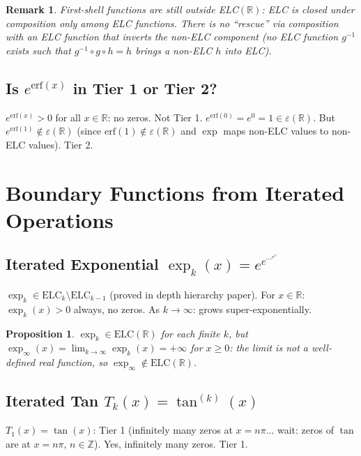 \documentclass[11pt]{article}
\newtheorem{proposition}[theorem]{Proposition}
\newtheorem{remark}[theorem]{Remark}
\begin{document}
\begin{remark}
First-shell functions are still outside ELC$(\mathbb{R})$: ELC is closed under composition
\emph{only among ELC functions}. There is no ``rescue'' via composition with an ELC function
that inverts the non-ELC component (no ELC function $g^{-1}$ exists such that $g^{-1}\circ g\circ h=h$
brings a non-ELC $h$ into ELC).
\end{remark}

\subsection{Is $e^{\mathrm{erf}(x)}$ in Tier 1 or Tier 2?}

$e^{\mathrm{erf}(x)}>0$ for all $x\in\mathbb{R}$: no zeros. Not Tier 1.
$e^{\mathrm{erf}(0)}=e^0=1\in\varepsilon(\mathbb{R})$. But $e^{\mathrm{erf}(1)}\notin\varepsilon(\mathbb{R})$
(since $\mathrm{erf}(1)\notin\varepsilon(\mathbb{R})$ and $\exp$ maps non-ELC values to non-ELC values).
Tier 2.

\section{Boundary Functions from Iterated Operations}

\subsection{Iterated Exponential $\exp_k(x)=e^{e^{\cdots^{e^x}}}$}

$\exp_k\in\mathrm{ELC}_k\setminus\mathrm{ELC}_{k-1}$ (proved in depth hierarchy paper).
For $x\in\mathbb{R}$: $\exp_k(x)>0$ always, no zeros. As $k\to\infty$: grows super-exponentially.

\begin{proposition}
$\exp_k\in\mathrm{ELC}(\mathbb{R})$ for each finite $k$, but
$\exp_\infty(x)=\lim_{k\to\infty}\exp_k(x)=+\infty$ for $x\geq0$:
the limit is not a well-defined real function, so $\exp_\infty\notin\mathrm{ELC}(\mathbb{R})$.
\end{proposition}

\subsection{Iterated Tan $T_k(x)=\tan^{(k)}(x)$}

$T_1(x)=\tan(x)$: Tier 1 (infinitely many zeros at $x=n\pi$... wait: zeros of $\tan$ are
at $x=n\pi$, $n\in\mathbb{Z}$). Yes, infinitely many zeros. Tier 1.
\end{document}
